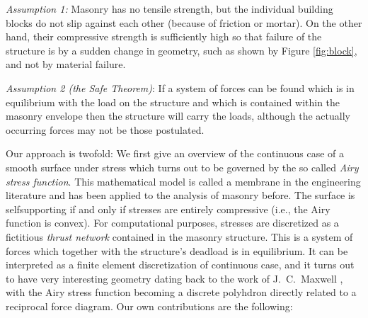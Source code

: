 \documentclass[annual]{acmsiggraph}
\begin{document}
{\it Assumption 1:} Masonry has no tensile strength, but the individual
building blocks do not slip against each other (because of friction or
mortar). On the other hand, their compressive strength is sufficiently
high so that failure of the structure is by a sudden change in geometry,
such as shown by Figure \ref{fig:block}, and not by material failure.

{\it Assumption 2 (the Safe Theorem)}: If a system of forces can be found
which is in equilibrium with the load on the structure and which is
contained within the masonry envelope then the structure will carry the
loads, although the actually occurring forces may not be those postulated.

Our approach is twofold: We first give an overview of the continuous case of a
smooth surface under stress which turns out to be governed by the so\dash
called {\em Airy stress function}. This mathematical model is called a
membrane in the engineering literature and has been applied to the
analysis of masonry before. The surface is self\dash supporting if and
only if stresses are entirely compressive (i.e., the Airy function is
convex). For computational purposes, stresses are discretized as a
fictitious {\em thrust network} \cite{Block07}
contained in the masonry structure.
This is a system of forces which together with the structure's deadload
is in equilibrium. It can be interpreted as a finite element discretization
of continuous case, and it turns out to have very interesting geometry
dating back to the work of J.\ C.\ Maxwell , with the
Airy stress function becoming a discrete polyhdron directly
related to a reciprocal force diagram. 
Our own contributions are the following:
\end{document}
